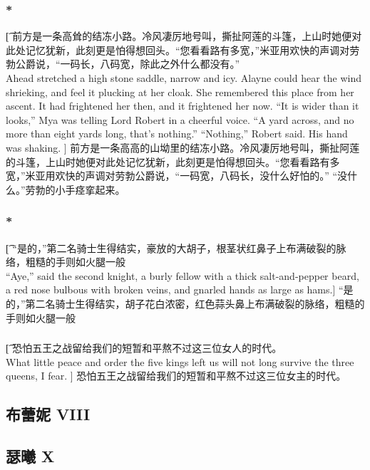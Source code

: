 \documentclass[12pt,a4paper]{article}
\begin{document}
\subsubsection{\color{red}*}\t[
	前方是一条高耸的结冻小路。冷风凄厉地号叫，撕扯阿莲的斗篷，上山时她便对此处记忆犹新，此刻更是怕得想回头。“您看看路有多宽，”米亚用欢快的声调对劳勃公爵说，“一码长，八码宽，除此之外什么都没有。”\\
	Ahead stretched a high stone saddle, narrow and icy. Alayne could hear the wind shrieking, and feel it plucking at her cloak. She remembered this place from her ascent. It had frightened her then, and it frightened her now. “It is wider than it looks,” Mya was telling Lord Robert in a cheerful voice. “A yard across, and no more than eight yards long, that's nothing.”
	 “Nothing,” Robert said. His hand was shaking. ]
	前方是一条高高的山坳里的结冻小路。冷风凄厉地号叫，撕扯阿莲的斗篷，上山时她便对此处记忆犹新，此刻更是怕得想回头。“您看看路有多宽，”米亚用欢快的声调对劳勃公爵说，“一码宽，八码长，没什么好怕的。”
	“没什么。”劳勃的小手痉挛起来。

\subsubsection{\color{red}*}\t[
	“是的，”第二名骑士生得结实，豪放的大胡子，根茎状红鼻子上布满破裂的脉络，粗糙的手则如火腿一般\\
	“Aye,” said the second knight, a burly fellow with a thick salt-and-pepper beard, a red nose bulbous with broken veins, and gnarled hands as large as hams.]
	“是的，”第二名骑士生得结实，胡子花白浓密，红色蒜头鼻上布满破裂的脉络，粗糙的手则如火腿一般
	 
\subsubsection{}\t[
	恐怕五王之战留给我们的短暂和平熬不过这三位女人的时代。\\
	What little peace and order the five kings left us will not long survive the three queens, I fear. ]
	恐怕五王之战留给我们的短暂和平熬不过这三位女主的时代。
	
	
\subsection{布蕾妮 VIII}

\subsection{瑟曦 X}
\end{document}
